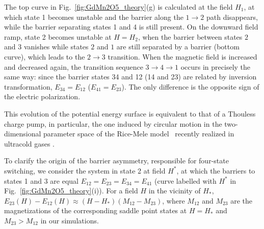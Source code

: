 The top curve in Fig.~\ref{fig:GdMn2O5_theory}(g) is calculated at the field $H_{1}$, at which state 1 becomes unstable and the barrier along the $1\to 2$ path disappears, while the barrier separating states 1 and 4 is still present. 
%
On the downward field ramp, state 2 becomes unstable at $H = H_2$, when the barrier between states $2$ and $3$ vanishes while states $2$ and $1$ are still separated by a barrier (bottom curve), which leads to the $2\to3$ transition.
%
When the magnetic field is increased and decreased again, the transition sequence $3 \to 4 \to 1$ occurs in precisely the same way: since the barrier states 34 and 12  (14 and 23) are related by inversion transformation,  $E_{34} = E_{12}$ ($E_{41} = E_{23}$). 
%
The only difference is the opposite sign of the electric polarization. 

This evolution of the potential energy surface is equivalent to that of a Thouless charge pump, in particular, the one induced by circular motion in the two-dimensional parameter space of the Rice-Mele model~\cite{Rice82} recently realized in ultracold gases \cite{Lohse16,Nakajima16,Atala13}.

To clarify the origin of the barrier asymmetry, responsible for four-state switching, we consider the system in state 2 at field $H^*$, at which the barriers to states 1 and 3 are equal $E_{12} = E_{23} = E_{34} = E_{41}$ (curve labelled with $H^*$ in Fig.~\ref{fig:GdMn2O5_theory}(i)).
For a field $H$ in the vicinity of $H_\ast$, $E_{23}(H) - E_{12}(H) \approx (H - H_\ast)(M_{12} - M_{23})$, where $M_{12}$ and $M_{23}$ are the magnetizations of the corresponding saddle point states at $H = H_\ast$ and $M_{23} > M_{12}$ in our simulations.


